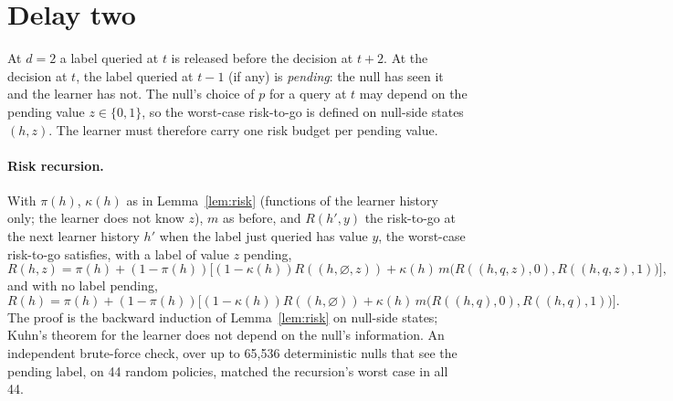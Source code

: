 \section{Delay two}
\label{app:delay2}

At $d=2$ a label queried at $t$ is released before the decision at $t+2$. At the decision at $t$, the label queried at $t-1$ (if any) is \emph{pending}: the null has seen it and the learner has not. The null's choice of $p$ for a query at $t$ may depend on the pending value $z\in\{0,1\}$, so the worst-case risk-to-go is defined on null-side states $(h,z)$. The learner must therefore carry one risk budget per pending value.

\paragraph{Risk recursion.} With $\pi(h)$, $\kappa(h)$ as in Lemma~\ref{lem:risk} (functions of the learner history only; the learner does not know $z$), $m$ as before, and $R(h',y)$ the risk-to-go at the next learner history $h'$ when the label just queried has value $y$, the worst-case risk-to-go satisfies,
with a label of value $z$ pending,
\[
R(h,z)=\pi(h)+(1-\pi(h))\Big[(1-\kappa(h))R((h,\varnothing,z))+\kappa(h)\,m\big(R((h,q,z),0),R((h,q,z),1)\big)\Big],
\]
and with no label pending,
\[
R(h)=\pi(h)+(1-\pi(h))\Big[(1-\kappa(h))R((h,\varnothing))+\kappa(h)\,m\big(R((h,q),0),R((h,q),1)\big)\Big].
\]
The proof is the backward induction of Lemma~\ref{lem:risk} on null-side states; Kuhn's theorem for the learner does not depend on the null's information. An independent brute-force check, over up to 65{,}536 deterministic nulls that see the pending label, on 44 random policies, matched the recursion's worst case in all 44.

